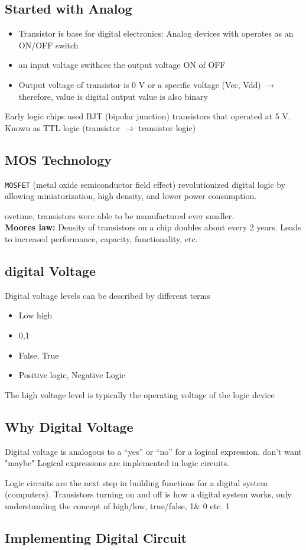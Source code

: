 \documentclass[a4paper, 12pt]{article}
\begin{document}
    \subsection*{Started with Analog}
    \begin{itemize}
        \item Transistor is base for digital electronics: 
        Analog devices with operates
        as an ON/OFF switch
        \item an input voltage swithces the output voltage ON of OFF
        \item Output voltage of transistor is 0 V or a specific voltage (Vcc, Vdd) $\rightarrow$
    therefore, value is digital output value is also binary
    \end{itemize}
    Early logic chips used BJT (bipolar junction) transistors that operated at 5 V. Known as TTL logic (transistor $\rightarrow$ transistor logic)

    \subsection*{MOS Technology}
    \texttt{MOSFET} (metal oxide semiconductor field effect) revolutionized digital logic by
    allowing miniaturization, high density, and lower power consumption.
    \par ovetime, transistors were able to be manufactured ever smaller.\\ \textbf{Moores law:} 
    Density of transistors on a chip doubles about every 2 years. Leads to
    increased performance, capacity, functionality, etc.

    \subsection{digital Voltage}
    Digital voltage levels can be described by different terms
    \begin{itemize}
        \item Low high
        \item 0,1
        \item False, True
        \item Positive logic, Negative Logic
    \end{itemize}
    The high voltage  level is typically the operating voltage of the logic device

    \subsection*{Why Digital Voltage}
    Digital voltage is analogous to a “yes” or “no” for a logical expression. don't want "maybe"
     Logical expressions are implemented in logic circuits.
     \par Logic circuits are the next step in building functions for a digital system (computers).
     Transistors turning on and off is how a digital system works, only understanding the concept 
     of high/low, true/false, 1\& 0 etc.
1
     \subsection*{Implementing Digital Circuit}
\end{document}
